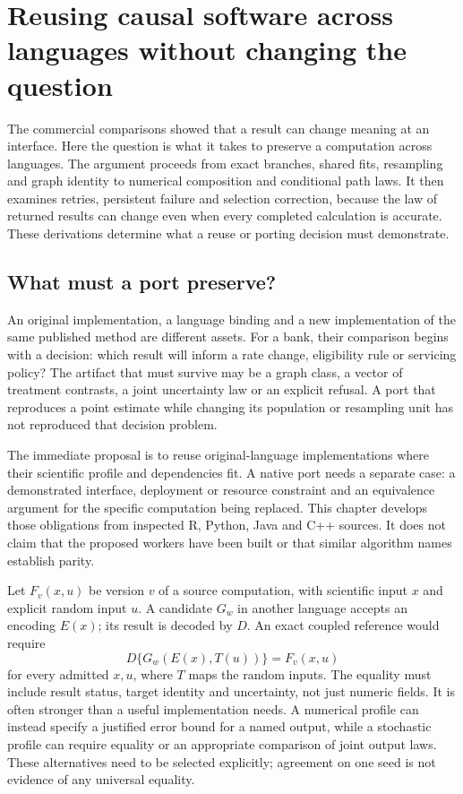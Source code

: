 \chapter{Reusing causal software across languages without changing the question}
\label{exec17:s9}

The commercial comparisons showed that a result can change meaning at an
interface. Here the question is what it takes to preserve a computation across
languages. The argument proceeds from exact branches, shared fits, resampling
and graph identity to numerical composition and conditional path laws. It then
examines retries, persistent failure and selection correction, because the
law of returned results can change even when every completed calculation is
accurate. These derivations determine what a reuse or porting decision must
demonstrate.

\section{What must a port preserve?}

An original implementation, a language binding and a new implementation of the
same published method are different assets. For a bank, their comparison begins
with a decision: which result will inform a rate change, eligibility rule or
servicing policy? The artifact that must survive may be a graph class, a vector
of treatment contrasts, a joint uncertainty law or an explicit refusal. A port
that reproduces a point estimate while changing its population or resampling
unit has not reproduced that decision problem.

The immediate proposal is to reuse original-language implementations where
their scientific profile and dependencies fit. A native port needs a separate
case: a demonstrated interface, deployment or resource constraint and an
equivalence argument for the specific computation being replaced. This chapter
develops those obligations from inspected R, Python, Java and C++ sources. It
does not claim that the proposed workers have been built or that similar
algorithm names establish parity.

Let $F_v(x,u)$ be version $v$ of a source computation, with scientific input
$x$ and explicit random input $u$. A candidate $G_w$ in another language accepts
an encoding $E(x)$; its result is decoded by $D$. An exact coupled reference
would require
\begin{equation}
 D\{G_w(E(x),T(u))\}=F_v(x,u)
 \label{exec17:s9-pathwise}
\end{equation}
for every admitted $x,u$, where $T$ maps the random inputs. The equality must
include result status, target identity and uncertainty, not just numeric fields.
It is often stronger than a useful implementation needs. A numerical profile
can instead specify a justified error bound for a named output, while a
stochastic profile can require equality or an appropriate comparison of joint
output laws. These alternatives need to be selected explicitly; agreement on
one seed is not evidence of any universal equality.

